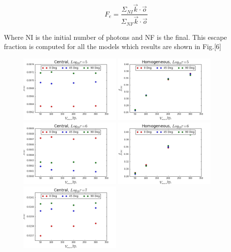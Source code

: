 \documentclass[usenatbib]{mn2e}
\begin{document}
\begin{equation}
F_{e}=\dfrac{\Sigma_{NI} \vec{k}\cdot \vec{o}}{\Sigma_{NF}\vec{k}\cdot \vec{o}}
\end{equation}

Where NI is the initial number of photons and NF is the final. This
escape fraction is computed for all the models which results are
shown in Fig.[6]\\ 
 
\begin{figure}
  \includegraphics[width=0.45\textwidth]{FECentral5.png}
  \includegraphics[width=0.45\textwidth]{FEHOM5.png}
  \includegraphics[width=0.45\textwidth]{FECentral6.png}
  \includegraphics[width=0.45\textwidth]{FEHOM6.png}
  \includegraphics[width=0.45\textwidth]{FECentral7.png}

\end{figure}
\end{document}
